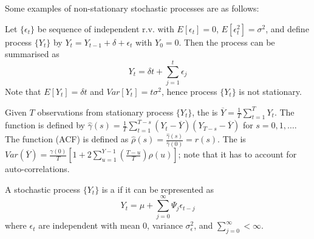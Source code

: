 Some examples of non-stationary stochastic processes are as follows:

\begin{example}  Let $\{\epsilon_t \}$ be sequence of independent r.v. with  $E[\epsilon_t] = 0$, $E[\epsilon_t^2] = \sigma^2$, and define process $\{Y_t\}$ by $Y_t = Y_{t-1} + \delta + \epsilon_t$ with $Y_0 = 0$. Then the process can be summarised as
\begin{equation*}
Y_t = \delta t + \sum\limits_{j=1}^t \epsilon_j \nonumber
\end{equation*}
Note that $E[Y_t] = \delta t$ and $Var[Y_t] = t \sigma^2$, hence process $\{Y_t\}$ is not stationary.
\end{example}

Given $T$ observations from stationary process $\{Y_t\}$, the  is $\overline{Y} = \frac{1}{T} \sum\limits_{t=1}^T Y_t$. The  function is defined by $\hat{\gamma}(s) = \frac{1}{T} \sum\limits_{t=1}^{T-s} (Y_t - \overline{Y})(Y_{T-s} - \overline{Y})$ for $s=0, 1, \ldots$. The  function (ACF) is defined as $\hat{\rho}(s) = \frac{\hat{\gamma}(s)}{\hat{\gamma}(0)} = r(s)$. The  is $Var(\overline{Y}) = \frac{\gamma(0)}{T}\left[1 + 2 \sum\limits_{u=1}^{Y-1} \left(\frac{T-u}{T} \right) \rho(u) \right]$; note that it has to account for auto-correlations.

\begin{definition} A stochastic process $\{Y_t\}$ is a  if it can be represented as
\begin{equation*}
Y_t = \mu + \sum\limits_{j=0}^{\infty} \Psi_j \epsilon_{t-j} \nonumber
\end{equation*}
where $\epsilon_t$ are independent with mean $0$, variance $\sigma_{\epsilon}^2$, and $\sum\limits_{j=0}^{\infty} < \infty$.
\end{definition}
